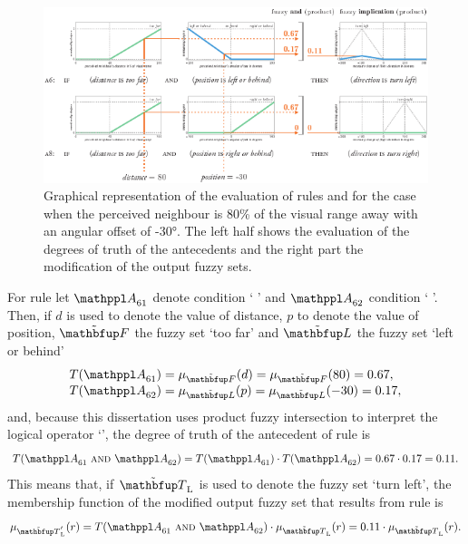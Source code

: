 \begin{figure}%
\includegraphics{fig[attractionFLSa6+a8]}
\caption{Graphical representation of the evaluation of rules  and  for the case when the perceived neighbour is 80\% of the visual range away with an angular offset of \ang{-30}. The left half shows the evaluation of the degrees of truth of the antecedents and the right part the modification of the output fuzzy sets.}
\label{fig:attraction:FLS:a6+a8}
\end{figure}

For rule  let $\statement{A}_{61}$ denote condition `  ' and $\statement{A}_{62}$ condition `  '. Then, if $d$ is used to denote the value of distance, $p$ to denote the value of position, $\fset{F}$ the fuzzy set `too far' and $\fset{L}$ the fuzzy set `left or behind'
\begin{equation}
\begin{array}{ll}
T(\statement{A}_{61})=\mu_\fset{F}(d)=\mu_\fset{F}(80)=0.67, \\
T(\statement{A}_{62})=\mu_\fset{L}(p)=\mu_\fset{L}(-30)=0.17,
\end{array}
\end{equation}
and, because this dissertation uses product fuzzy intersection to interpret the logical operator `', the degree of truth of the antecedent of rule  is 
\begin{equation}
T(\statement{A}_{61}\ \kwd{and}\ \statement{A}_{62})=T(\statement{A}_{61}) \cdot T(\statement{A}_{62})=0.67 \cdot 0.17 = 0.11.
\end{equation}
This means that, if $\fset{T}_\textnormal{L}$ is used to denote the fuzzy set `turn left', the membership function of the modified output fuzzy set that results from rule  is 
\begin{equation}
\mu_{{\fset{T}_\textnormal{L}}'}(r)=T(\statement{A}_{61}\ \kwd{and}\ \statement{A}_{62}) \cdot \mu_{\fset{T}_\textnormal{L}}(r)=0.11 \cdot \mu_{\fset{T}_\textnormal{L}}(r).
\end{equation}


